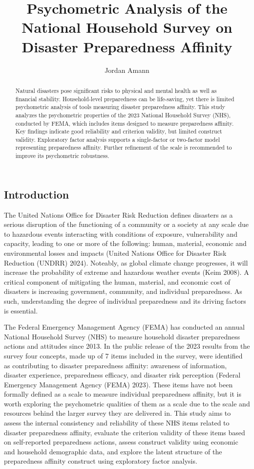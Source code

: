 \documentclass[
  letterpaper,
  DIV=11,
  numbers=noendperiod]{scrartcl}
\title{Psychometric Analysis of the National Household Survey on
Disaster Preparedness Affinity}
\author{Jordan Amann}
\date{}
\begin{document}
\maketitle
\begin{abstract}
Natural disasters pose significant risks to physical and mental health
as well as financial stability. Household-level preparedness can be
life-saving, yet there is limited psychometric analysis of tools
measuring disaster preparedness affinity. This study analyzes the
psychometric properties of the 2023 National Household Survey (NHS),
conducted by FEMA, which includes items designed to measure preparedness
affinity. Key findings indicate good reliability and criterion validity,
but limited construct validity. Exploratory factor analysis supports a
single-factor or two-factor model representing preparedness affinity.
Further refinement of the scale is recommended to improve its
psychometric robustness.
\end{abstract}

\subsection{Introduction}\label{introduction}

The United Nations Office for Disaster Risk Reduction defines disasters
as a serious disruption of the functioning of a community or a society
at any scale due to hazardous events interacting with conditions of
exposure, vulnerability and capacity, leading to one or more of the
following: human, material, economic and environmental losses and
impacts (United Nations Office for Disaster Risk Reduction (UNDRR)
2024). Noteably, as global climate change progresses, it will increase
the probability of extreme and hazardous weather events (Keim 2008). A
critical component of mitigating the human, material, and economic cost
of disasters is increasing government, community, and individual
preparedness. As such, understanding the degree of individual
preparedness and its driving factors is essential.

The Federal Emergency Management Agency (FEMA) has conducted an annual
National Household Survey (NHS) to measure household disaster
preparedness actions and attitudes since 2013. In the public release of
the 2023 results from the survey four concepts, made up of 7 items
included in the survey, were identified as contributing to disaster
preparedness affinity: awareness of information, disaster experience,
preparedness efficacy, and disaster risk perception (Federal Emergency
Management Agency (FEMA) 2023). These items have not been formally
defined as a scale to measure individual preparedness affinity, but it
is worth exploring the psychometric qualities of them as a scale due to
the scale and resources behind the larger survey they are delivered in.
This study aims to assess the internal consistency and reliability of
these NHS items related to disaster preparedness affinity, evaluate the
criterion validity of these items based on self-reported preparedness
actions, assess construct validity using economic and household
demographic data, and explore the latent structure of the preparedness
affinity construct using exploratory factor analysis.
\end{document}
